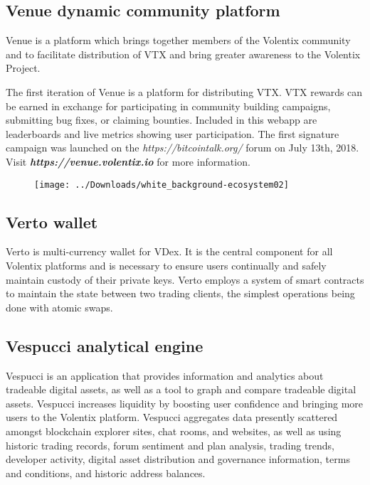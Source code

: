 \documentclass[]{article}
\begin{document}
{\subsection {Venue dynamic community platform}

Venue is a platform which brings together members of the Volentix community 
and to facilitate distribution of VTX and bring greater awareness to the Volentix Project. 

The first iteration of Venue is a platform for distributing VTX. 
VTX rewards can be earned in exchange for participating in community building campaigns, submitting bug fixes, or claiming bounties. 
Included in this webapp are leaderboards and live metrics showing user participation. 
The first signature campaign was launched on the \textit{https://bitcointalk.org/} forum on July 13th, 2018. 
Visit \textbf{\textit{https://venue.volentix.io}} for more information. 
	
\begin{figure}
	\centering
	\texttt{[image: ../Downloads/white\_background-ecosystem02]}
	\caption{}
	\label{fig:whitebackground-ecosystem02}
\end{figure}



\subsection {Verto wallet}
Verto is multi-currency wallet for VDex. 
It is the central component for all Volentix platforms and is necessary to ensure users continually and safely maintain custody of their private keys.
Verto employs a system of smart contracts to maintain the state between two trading clients, the simplest operations being done with atomic swaps. 

\subsection {Vespucci analytical engine}
Vespucci is an application that provides information and analytics about tradeable digital assets, 
as well as a tool to graph and compare tradeable digital assets. 
Vespucci increases liquidity by boosting user confidence and bringing more users to the Volentix platform.
Vespucci aggregates data presently scattered amongst blockchain explorer sites, chat rooms, and websites, 
as well as using historic trading records, forum sentiment and plan analysis, trading trends, developer activity,
digital asset distribution and governance information, terms and conditions, and historic address balances.




}
\end{document}
